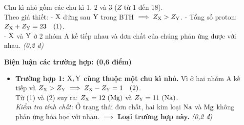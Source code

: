 \documentclass[11pt,a4paper]{article}
\begin{document}
\begin{tcolorbox}[colback=white,colframe=solBlue,title=\textbf{Lời giải chi tiết và Biểu điểm Câu 3:}]
Chu kì nhỏ gồm các chu kì 1, 2 và 3 ($Z$ từ 1 đến 18).\\
Theo giả thiết:
- $\ce{X}$ đứng sau $\ce{Y}$ trong BTH $\implies Z_{\ce{X}} > Z_{\ce{Y}}$.
- Tổng số proton: $Z_{\ce{X}} + Z_{\ce{Y}} = 23 \quad (1)$.\\
- $\ce{X}$ và $\ce{Y}$ ở 2 nhóm A kế tiếp nhau và đơn chất của chúng phản ứng được với nhau. \hfill \textit{(0,2 đ)}

\textbf{Biện luận các trường hợp: (0,6 điểm)}
\begin{itemize}[leftmargin=1.2cm]
\item \textbf{Trường hợp 1: $\ce{X, Y}$ cùng thuộc một chu kì nhỏ.}
  Vì ở hai nhóm A kế tiếp và $Z_{\ce{X}} > Z_{\ce{Y}} \implies Z_{\ce{X}} - Z_{\ce{Y}} = 1 \quad (2)$.\\
  Từ (1) và (2) suy ra: $Z_{\ce{X}} = 12\ (\ce{Mg})$ và $Z_{\ce{Y}} = 11\ (\ce{Na})$.\\
  \textit{Kiểm tra tính chất:} Ở trạng thái đơn chất, hai kim loại $\ce{Na}$ và $\ce{Mg}$ không phản ứng hóa học với nhau. $\implies$ \textbf{Loại trường hợp này.} \hfill \textit{(0,2 đ)}


\end{itemize}
\end{tcolorbox}
\end{document}
